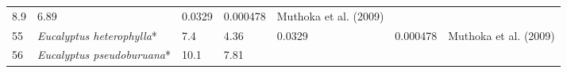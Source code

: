 \documentclass[]{article}
\begin{document}
\begin{longtable}[]{@{}lllllll@{}}
\begin{minipage}[t]{0.05\columnwidth}
8.9\strut
\end{minipage} & \begin{minipage}[t]{0.08\columnwidth}\raggedright
6.89\strut
\end{minipage} & \begin{minipage}[t]{0.08\columnwidth}\raggedright
0.0329\strut
\end{minipage} & \begin{minipage}[t]{0.08\columnwidth}\raggedright
0.000478\strut
\end{minipage} & \begin{minipage}[t]{0.23\columnwidth}\raggedright
Muthoka et al. (2009)\strut
\end{minipage}\tabularnewline
\begin{minipage}[t]{0.05\columnwidth}\raggedright
55\strut
\end{minipage} & \begin{minipage}[t]{0.23\columnwidth}\raggedright
\emph{Eucalyptus heterophylla}*\strut
\end{minipage} & \begin{minipage}[t]{0.05\columnwidth}\raggedright
7.4\strut
\end{minipage} & \begin{minipage}[t]{0.08\columnwidth}\raggedright
4.36\strut
\end{minipage} & \begin{minipage}[t]{0.08\columnwidth}\raggedright
0.0329\strut
\end{minipage} & \begin{minipage}[t]{0.08\columnwidth}\raggedright
0.000478\strut
\end{minipage} & \begin{minipage}[t]{0.23\columnwidth}\raggedright
Muthoka et al. (2009)\strut
\end{minipage}\tabularnewline
\begin{minipage}[t]{0.05\columnwidth}\raggedright
56\strut
\end{minipage} & \begin{minipage}[t]{0.23\columnwidth}\raggedright
\emph{Eucalyptus pseudoburuana}*\strut
\end{minipage} & \begin{minipage}[t]{0.05\columnwidth}\raggedright
10.1\strut
\end{minipage} & \begin{minipage}[t]{0.08\columnwidth}\raggedright
7.81\strut
\end{minipage} & \begin{minipage}[t]{0.08\columnwidth}\raggedright

\end{minipage}
\end{longtable}
\end{document}
